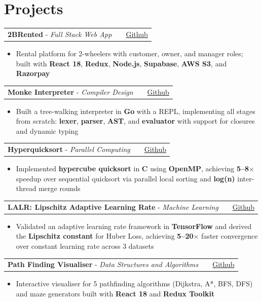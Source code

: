 \documentclass[a4paper,9pt]{article}
\makeatletter
\newenvironment{project}[3]
    {
    \begin{tabularx}{\linewidth}{@{}l X r@{}}
    \textbf{#1} - \textit{#2} && #3 \\[3.75pt]
    \end{tabularx}
    \begin{minipage}[t]{\linewidth}
    \begin{itemize}[nosep, leftmargin=1em, itemsep=1pt, label=\textbullet]
    }
    {
    \end{itemize}
    \end{minipage}
    }
\makeatother
\begin{document}
\section{Projects}

\begin{project}{2BRented}{Full Stack Web App}{\href{https://github.com/nameetrajore/2BRented}{Github}}
  \item Rental platform for 2-wheelers with customer, owner, and manager roles; built with \textbf{React 18}, \textbf{Redux}, \textbf{Node.js}, \textbf{Supabase}, \textbf{AWS S3}, and \textbf{Razorpay}
\end{project}

\begin{project}{Monke Interpreter}{Compiler Design}{\href{https://github.com/nameetrajore/monke-interpreter}{Github}}
  \item Built a tree-walking interpreter in \textbf{Go} with a REPL, implementing all stages from scratch: \textbf{lexer}, \textbf{parser}, \textbf{AST}, and \textbf{evaluator} with support for closures and dynamic typing
\end{project}

\begin{project}{Hyperquicksort}{Parallel Computing}{\href{https://github.com/nameetrajore/hyperquicksort-openmp}{Github}}
  \item Implemented \textbf{hypercube quicksort} in \textbf{C} using \textbf{OpenMP}, achieving \textbf{5--8$\times$} speedup over sequential quicksort via parallel local sorting and \textbf{log(n)} inter-thread merge rounds
\end{project}

\begin{project}{LALR: Lipschitz Adaptive Learning Rate}{Machine Learning}{\href{https://github.com/nameetrajore/Linear_Regression-and-Quantile_Regression-Using-LALR}{Github}}
  \item Validated an adaptive learning rate framework in \textbf{TensorFlow} and derived the \textbf{Lipschitz constant} for Huber Loss, achieving \textbf{5--20$\times$} faster convergence over constant learning rate across 3 datasets
\end{project}

\begin{project}{Path Finding Visualiser}{Data Structures and Algorithms}{\href{https://github.com/nameetrajore/path-finding-visualiser}{Github}}
  \item Interactive visualiser for 5 pathfinding algorithms (Dijkstra, A*, BFS, DFS) and maze generators built with \textbf{React 18} and \textbf{Redux Toolkit}
\end{project}
\end{document}
